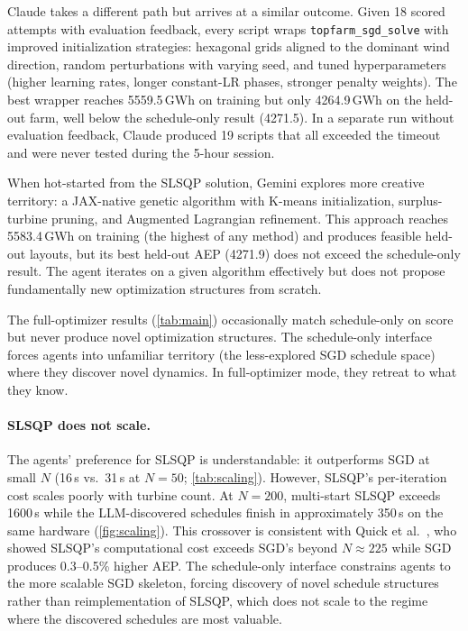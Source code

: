 \documentclass{article}
\begin{document}
Claude takes a different path but arrives at a similar outcome. Given
18 scored attempts with evaluation feedback, every script wraps
\texttt{topfarm\_sgd\_solve} with improved initialization strategies:
hexagonal grids aligned to the dominant wind direction, random
perturbations with varying seed, and tuned hyperparameters (higher
learning rates, longer constant-LR phases, stronger penalty weights).
The best wrapper reaches 5559.5\,GWh on training but only 4264.9\,GWh
on the held-out farm, well below the schedule-only result (4271.5).
In a separate run without evaluation feedback, Claude produced 19
scripts that all exceeded the timeout and were never tested during the
5-hour session.

When hot-started from the SLSQP solution, Gemini explores more
creative territory: a JAX-native genetic algorithm with K-means
initialization, surplus-turbine pruning, and Augmented Lagrangian
refinement. This approach reaches 5583.4\,GWh on training (the highest
of any method) and produces feasible held-out layouts, but its best
held-out AEP (4271.9) does not exceed the schedule-only result. The
agent iterates on a given algorithm effectively but does not propose
fundamentally new optimization structures from scratch.

The full-optimizer results (\cref{tab:main}) occasionally match
schedule-only on score but never produce novel optimization
structures. The schedule-only interface forces agents into unfamiliar
territory (the less-explored SGD schedule space) where they discover
novel dynamics. In full-optimizer mode, they retreat to what they
know.

\paragraph{SLSQP does not scale.}
The agents' preference for SLSQP is understandable: it outperforms SGD
at small $N$ (16\,s vs.\ 31\,s at $N{=}50$; \cref{tab:scaling}).
However, SLSQP's per-iteration cost scales poorly with turbine count.
At $N{=}200$, multi-start SLSQP exceeds 1600\,s while the
LLM-discovered schedules finish in approximately 350\,s on the same
hardware (\cref{fig:scaling}). This crossover is consistent with Quick
et al.~\cite{quick2023sgd}, who showed SLSQP's computational cost
exceeds SGD's beyond $N{\approx}225$ while SGD produces 0.3--0.5\%
higher AEP. The schedule-only interface constrains agents to the more
scalable SGD skeleton, forcing discovery of novel schedule structures
rather than reimplementation of SLSQP, which does not scale to the
regime where the discovered schedules are most valuable.
\end{document}
